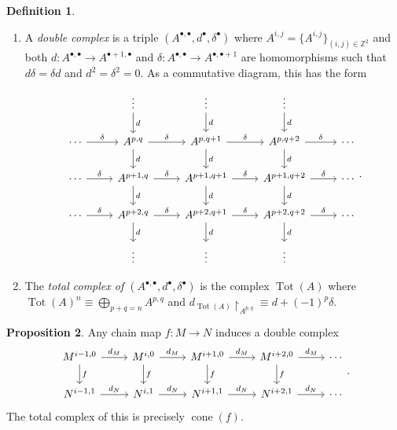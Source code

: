 \documentclass[10pt,letterpaper,cm]{nupset}
\theoremstyle{definition}
\newtheorem{definition}{Definition}[subsection]
\theoremstyle{theorem}
\newtheorem{prop}[definition]{Proposition}
\theoremstyle{remark}
\newcommand{\Z}{\mathbb Z}
\newcommand{\1}{\mathbf{1}}
\newcommand{\0}{\vec 0}
\DeclareMathOperator{\cone}{cone}
\DeclareMathOperator{\tot}{Tot}
\begin{document}
\begin{definition} $ $
\begin{enumerate}
\item A \textit{double complex} is a triple $\left(A^{\bullet, \bullet}, d^{\bullet}, \delta^{\bullet}\right)$ where $A^{i,j} = \{A^{i,j}\}_{(i,j) \in \Z^2}$ and both $d : A^{\bullet, \bullet} \to A^{\bullet +1, \bullet}$ and $\delta : A^{\bullet, \bullet} \to A^{\bullet, \bullet +1}$ are homomorphisms such that $d{\delta} = \delta{d}$ and $d^2 = \delta^2 =0$.
As a commutative diagram, this has the form
 \[
\begin{tikzcd}
                           & \vdots \arrow[d, "d"]                           & \vdots \arrow[d, "d"]                            & \vdots \arrow[d, "d"]                            &        \\
\cdots \arrow[r, "\delta"] & {A^{p,q}} \arrow[d, "d"] \arrow[r, "\delta"]    & {A^{p,q+1}} \arrow[d, "d"] \arrow[r, "\delta"]   & {A^{p,q+2}} \arrow[r, "\delta"] \arrow[d, "d"]   & \cdots \\
\cdots \arrow[r, "\delta"] & {A^{p+1, q}} \arrow[d, "d"] \arrow[r, "\delta"] & {A^{p+1,q+1}} \arrow[d, "d"] \arrow[r, "\delta"] & {A^{p+1,q+2}} \arrow[r, "\delta"] \arrow[d, "d"] & \cdots \\
\cdots \arrow[r, "\delta"] & {A^{p+2, q}} \arrow[r, "\delta"] \arrow[d, "d"] & {A^{p+2,q+1}} \arrow[r, "\delta"] \arrow[d, "d"] & {A^{p+2,q+2}} \arrow[r, "\delta"] \arrow[d, "d"] & \cdots \\
                           & \vdots                                          & \vdots                                           & \vdots                                           &       
\end{tikzcd}
.\]
\item The \textit{total complex of $\left(A^{\bullet, \bullet}, d^{\bullet}, \delta^{\bullet}\right)$} is the complex $ \tot(A)$ where $\tot(A)^n \equiv \bigoplus_{p+q =n} A^{p,q}$ and $d_{\tot(A)}\restriction_{A^{p,q}} \equiv d + ({-1})^p \delta$. 
\end{enumerate}
\end{definition}

\begin{prop}
Any chain map $f: M \to N$ induces a double complex 
\[
\begin{tikzcd}
{M^{i-1, 0}} \arrow[d, "f"] \arrow[r, "d_M"] & M^{i,0} \arrow[d, "f"] \arrow[r, "d_M"] & M^{i+1,0} \arrow[d, "f"] \arrow[r, "d_M"] & M^{i+2,0} \arrow[d, "f"] \arrow[r, "d_M"] & \cdots \\
{N^{i-1,1}} \arrow[r, "d_N"]                 & N^{i,1} \arrow[r, "d_N"]                & N^{i+1,1} \arrow[r, "d_N"]                & N^{i+2,1} \arrow[r, "d_N"]                & \cdots
\end{tikzcd}
.\]
The total complex of this is precisely $\cone(f)$.
\end{prop}
\end{document}
